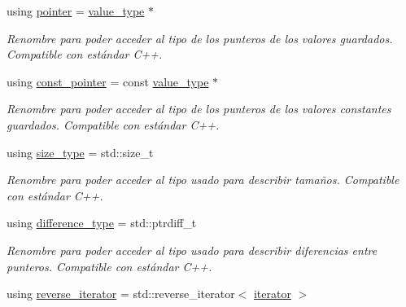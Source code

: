 \begin{DoxyCompactItemize}
\mbox{\label{classaed2_1_1map_a7394e98a23b86bc008ad73326b273fd5}} 
using \hyperlink{classaed2_1_1map_a7394e98a23b86bc008ad73326b273fd5}{pointer} = \hyperlink{classaed2_1_1map_a719db98e0ff9a837610f76be33264680}{value\+\_\+type} $\ast$
\begin{DoxyCompactList}\small\item\em Renombre para poder acceder al tipo de los punteros de los valores guardados. Compatible con estándar C++. \end{DoxyCompactList}\item 
\mbox{\label{classaed2_1_1map_a1366fc3e227a49777cb748fc6d4e022b}} 
using \hyperlink{classaed2_1_1map_a1366fc3e227a49777cb748fc6d4e022b}{const\+\_\+pointer} = const \hyperlink{classaed2_1_1map_a719db98e0ff9a837610f76be33264680}{value\+\_\+type} $\ast$
\begin{DoxyCompactList}\small\item\em Renombre para poder acceder al tipo de los punteros de los valores constantes guardados. Compatible con estándar C++. \end{DoxyCompactList}\item 
\mbox{\label{classaed2_1_1map_a8cf1c570f605e9c0ad6feb8ce12c9400}} 
using \hyperlink{classaed2_1_1map_a8cf1c570f605e9c0ad6feb8ce12c9400}{size\+\_\+type} = std\+::size\+\_\+t
\begin{DoxyCompactList}\small\item\em Renombre para poder acceder al tipo usado para describir tamaños. Compatible con estándar C++. \end{DoxyCompactList}\item 
\mbox{\label{classaed2_1_1map_a2f55b88809000fcbfce1c6cfef1ba74d}} 
using \hyperlink{classaed2_1_1map_a2f55b88809000fcbfce1c6cfef1ba74d}{difference\+\_\+type} = std\+::ptrdiff\+\_\+t
\begin{DoxyCompactList}\small\item\em Renombre para poder acceder al tipo usado para describir diferencias entre punteros. Compatible con estándar C++. \end{DoxyCompactList}\item 
using \hyperlink{classaed2_1_1map_a8e6a592062260177fd73b2f9897b1dd5}{reverse\+\_\+iterator} = std\+::reverse\+\_\+iterator$<$ \hyperlink{classaed2_1_1map_1_1iterator}{iterator} $>$

\end{DoxyCompactItemize}

